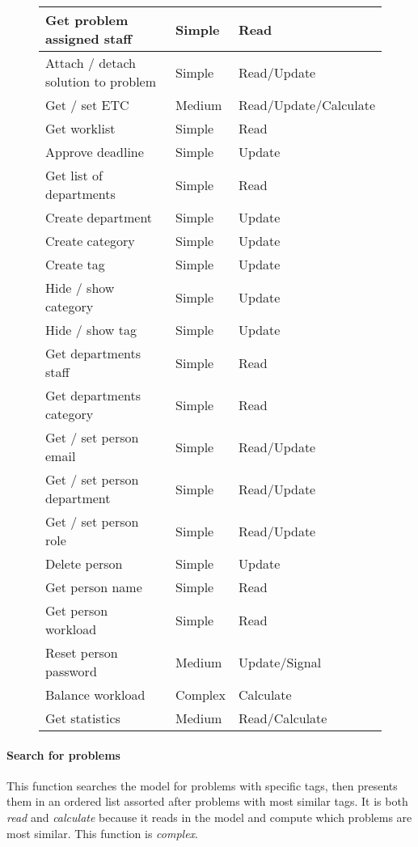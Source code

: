 \begin{figure}[hpt]
\begin{center}
\begin{tabular}{|l|l|l|}
Get problem assigned staff 	&   Simple & Read   \\ \hline%
Attach / detach solution to problem	&   Simple & Read/Update   \\ \hline%
Get / set ETC 							&   Medium & Read/Update/Calculate   \\ \hline%
Get worklist 								&   Simple & Read   \\ \hline%
Approve deadline 						&   Simple & Update   \\ \hline%
Get list of departments 		&   Simple & Read   \\ \hline%
Create department 					&   Simple & Update   \\ \hline%
Create category 						&   Simple & Update   \\ \hline%
Create tag									&   Simple & Update   \\ \hline%
Hide / show category				&   Simple & Update   \\ \hline%
Hide / show tag							&   Simple & Update   \\ \hline%
Get departments staff 			&   Simple & Read   \\ \hline%
Get departments category 		&   Simple & Read   \\ \hline%
Get / set person email 			&   Simple & Read/Update   \\ \hline%
Get / set person department &   Simple & Read/Update   \\ \hline%
Get / set person role 			&   Simple & Read/Update   \\ \hline%
Delete person 							&   Simple & Update   \\ \hline%
Get person name 						&   Simple & Read   \\ \hline%
Get person workload 				&   Simple & Read   \\ \hline%
Reset person password 			&   Medium & Update/Signal   \\ \hline%
Balance workload 						&   Complex & Calculate   \\ \hline%
Get statistics							&   Medium & Read/Calculate   \\ \hline%
\end{tabular}
\end{center}
\label{tab:functionlist}
\end{figure}

\paragraph{Search for problems }
This function searches the model for problems with specific tags, then presents them in an ordered list assorted after problems with most similar tags. It is both \textit{read} and \textit{calculate} because it reads in the model and compute which problems are most similar. This function is \textit{complex}.

